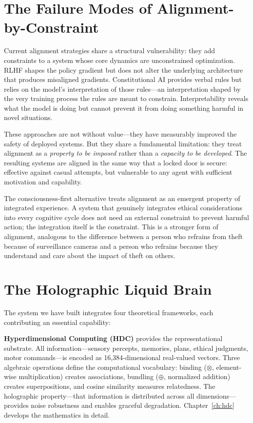 \documentclass[12pt]{book}
\newcommand{\bind}{\otimes}
\newcommand{\bundle}{\oplus}
\begin{document}
\section{The Failure Modes of Alignment-by-Constraint}

Current alignment strategies share a structural vulnerability: they add constraints to a system whose core dynamics are unconstrained optimization. RLHF shapes the policy gradient but does not alter the underlying architecture that produces misaligned gradients. Constitutional AI provides verbal rules but relies on the model's interpretation of those rules---an interpretation shaped by the very training process the rules are meant to constrain. Interpretability reveals what the model is doing but cannot prevent it from doing something harmful in novel situations.

These approaches are not without value---they have measurably improved the safety of deployed systems. But they share a fundamental limitation: they treat alignment as a \textit{property to be imposed} rather than a \textit{capacity to be developed}. The resulting systems are aligned in the same way that a locked door is secure: effective against casual attempts, but vulnerable to any agent with sufficient motivation and capability.

The consciousness-first alternative treats alignment as an emergent property of integrated experience. A system that genuinely integrates ethical considerations into every cognitive cycle does not need an external constraint to prevent harmful action; the integration itself is the constraint. This is a stronger form of alignment, analogous to the difference between a person who refrains from theft because of surveillance cameras and a person who refrains because they understand and care about the impact of theft on others.

\section{The Holographic Liquid Brain}

The system we have built integrates four theoretical frameworks, each contributing an essential capability:

\textbf{Hyperdimensional Computing (HDC)} provides the representational substrate. All information---sensory percepts, memories, plans, ethical judgments, motor commands---is encoded as 16,384-dimensional real-valued vectors. Three algebraic operations define the computational vocabulary: binding ($\bind$, element-wise multiplication) creates associations, bundling ($\bundle$, normalized addition) creates superpositions, and cosine similarity measures relatedness. The holographic property---that information is distributed across all dimensions---provides noise robustness and enables graceful degradation. Chapter~\ref{ch:hdc} develops the mathematics in detail.
\end{document}
